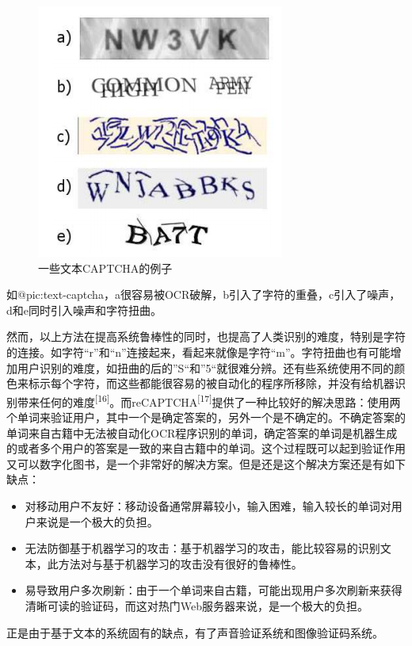 \documentclass[bachelor,zhspacing]{cqu}  %
\begin{document}
\begin{figure}[htbp]
\centering
\includegraphics{pic/text-captcha.png}
\caption{一些文本CAPTCHA的例子}\label{pic:text-captcha}
\end{figure}

如@pic:text-captcha，a很容易被OCR破解，b引入了字符的重叠，c引入了噪声，d和e同时引入噪声和字符扭曲。

然而，以上方法在提高系统鲁棒性的同时，也提高了人类识别的难度，特别是字符的连接。如字符``r''和``n''连接起来，看起来就像是字符``m''。字符扭曲也有可能增加用户识别的难度，如扭曲的后的''S``和''5``就很难分辨。还有些系统使用不同的颜色来标示每个字符，而这些都能很容易的被自动化的程序所移除，并没有给机器识别带来任何的难度\textsuperscript{{[}16{]}}。而reCAPTCHA\textsuperscript{{[}17{]}}提供了一种比较好的解决思路：使用两个单词来验证用户，其中一个是确定答案的，另外一个是不确定的。不确定答案的单词来自古籍中无法被自动化OCR程序识别的单词，确定答案的单词是机器生成的或者多个用户的答案是一致的来自古籍中的单词。这个过程既可以起到验证作用又可以数字化图书，是一个非常好的解决方案。但是还是这个解决方案还是有如下缺点：

\begin{itemize}
\tightlist
\item
  对移动用户不友好：移动设备通常屏幕较小，输入困难，输入较长的单词对用户来说是一个极大的负担。
\item
  无法防御基于机器学习的攻击：基于机器学习的攻击，能比较容易的识别文本，此方法对与基于机器学习的攻击没有很好的鲁棒性。
\item
  易导致用户多次刷新：由于一个单词来自古籍，可能出现用户多次刷新来获得清晰可读的验证码，而这对热门Web服务器来说，是一个极大的负担。
\end{itemize}

正是由于基于文本的系统固有的缺点，有了声音验证系统和图像验证码系统。
\end{document}
